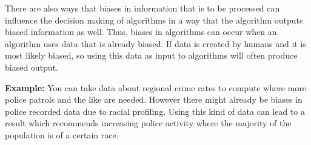 \documentclass[a4paper]{article}
\begin{document}
There are also ways that biases in information that is to be processed can influence the decision making of algorithms in a way that the algorithm outputs biased information as well.
Thus, biases in algorithms can occur when an algorithm uses data that is already biased.
If data is created by humans and it is most likely biased, so using this data as input to algorithms will often produce biased output.

\textbf{Example:} You can take data about regional crime rates to compute where more police patrols and the like are needed. However there might already be biases in police recorded data due to racial profiling. Using this kind of data can lead to a result which recommends increasing police activity where the majority of the population is of a certain race.





\end{document}
